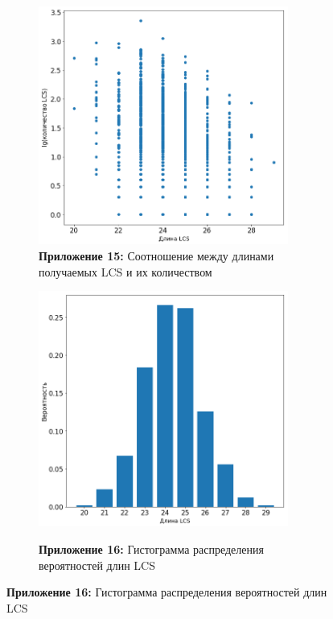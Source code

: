 \documentclass[a4paper,12pt]{extarticle}
\begin{document}
\begin{figure}[h]
  \centering
  \begin{subfigure}{.5\textwidth}
    \centering
    \captionsetup{justification=centering}
    \caption*{\textbf{Приложение 15:} Соотношение между длинами получаемых LCS и их количеством}
    \label{diog:2}
    \includegraphics[width=0.9\textwidth]{Diogram_2.png}
  \end{subfigure}%
  \begin{subfigure}{.5\textwidth}
    \centering
    \captionsetup{justification=centering}
    \caption*{\textbf{Приложение 16:} Гистограмма распределения вероятностей длин LCS}
    \label{diog:3}
    \includegraphics[width=0.9\textwidth]{Diogram_3.png}
    \label{fig:sub2}
  \end{subfigure}
  \vspace{-0.5cm}
\end{figure}
\end{document}
